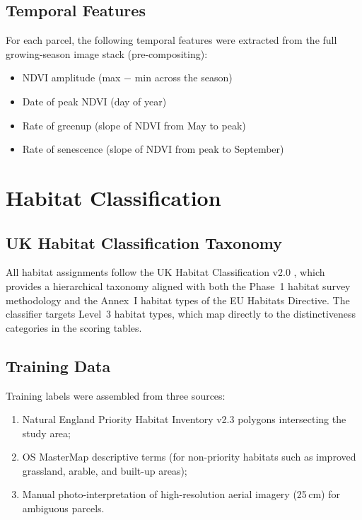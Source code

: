 \subsection{Temporal Features}

For each parcel, the following temporal features were extracted from the full growing-season image stack (pre-compositing):
\begin{itemize}[nosep]
  \item NDVI amplitude (max $-$ min across the season)
  \item Date of peak NDVI (day of year)
  \item Rate of greenup (slope of NDVI from May to peak)
  \item Rate of senescence (slope of NDVI from peak to September)
\end{itemize}


\section{Habitat Classification}
\label{sec:classification}

\subsection{UK Habitat Classification Taxonomy}

All habitat assignments follow the UK Habitat Classification v2.0 \citep{ukhab_v2}, which provides a hierarchical taxonomy aligned with both the Phase~1 habitat survey methodology and the Annex~I habitat types of the EU Habitats Directive. The classifier targets Level~3 habitat types, which map directly to the distinctiveness categories in the \BM{} scoring tables.

\subsection{Training Data}

Training labels were assembled from three sources:
\begin{enumerate}[nosep]
  \item Natural England Priority Habitat Inventory v2.3 polygons intersecting the study area;
  \item OS MasterMap descriptive terms (for non-priority habitats such as improved grassland, arable, and built-up areas);
  \item Manual photo-interpretation of high-resolution aerial imagery (25\,cm) for ambiguous parcels.
\end{enumerate}


